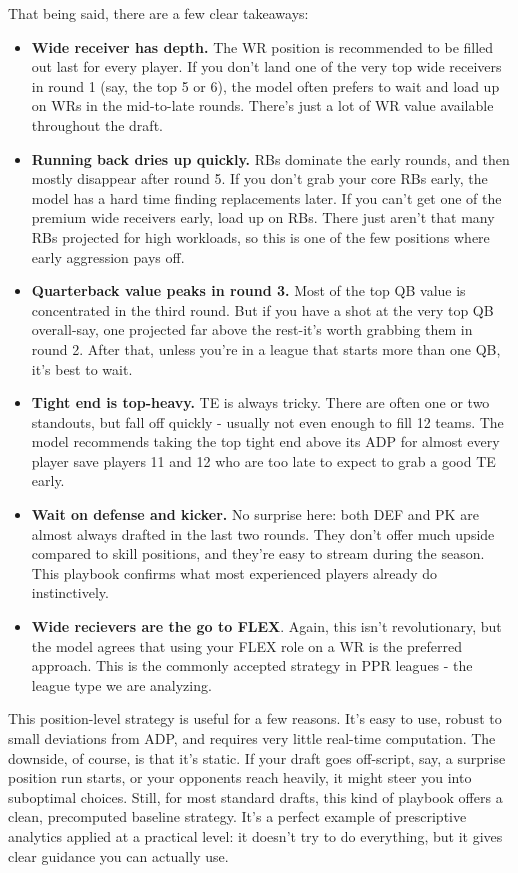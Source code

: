 \documentclass{article}
\begin{document}
That being said, there are a few clear takeaways:
\begin{itemize}
  \item \textbf{Wide receiver has depth.} The WR position is recommended to be filled out last for every player. If you don't land one of the very top wide receivers in round 1 (say, the top 5 or 6), the model often prefers to wait and load up on WRs in the mid-to-late rounds. There's just a lot of WR value available throughout the draft.
  \item \textbf{Running back dries up quickly.} RBs dominate the early rounds, and then mostly disappear after round 5. If you don't grab your core RBs early, the model has a hard time finding replacements later. If you can't get one of the premium wide receivers early, load up on RBs. There just aren't that many RBs projected for high workloads, so this is one of the few positions where early aggression pays off.
  \item \textbf{Quarterback value peaks in round 3.} Most of the top QB value is concentrated in the third round. But if you have a shot at the very top QB overall-say, one projected far above the rest-it's worth grabbing them in round 2. After that, unless you're in a league that starts more than one QB, it's best to wait.
  \item \textbf{Tight end is top-heavy.} TE is always tricky.  There are often one or two standouts, but fall off quickly - usually not even enough to fill 12 teams.  The model recommends taking the top tight end above its ADP for almost every player save players 11 and 12 who are too late to expect to grab a good TE early.
  \item \textbf{Wait on defense and kicker.} No surprise here: both DEF and PK are almost always drafted in the last two rounds. They don't offer much upside compared to skill positions, and they're easy to stream during the season. This playbook confirms what most experienced players already do instinctively.
  \item \textbf{Wide recievers are the go to FLEX}.  Again, this isn't revolutionary, but the model agrees that using your FLEX role on a WR is the preferred approach.  This is the commonly accepted strategy in PPR leagues - the league type we are analyzing.
\end{itemize}

This position-level strategy is useful for a few reasons.
It's easy to use, robust to small deviations from ADP, and requires very little real-time computation.
The downside, of course, is that it's static. If your draft goes off-script, say, a surprise position run starts, or your opponents reach heavily, it might steer you into suboptimal choices.
Still, for most standard drafts, this kind of playbook offers a clean, precomputed baseline strategy.
It's a perfect example of prescriptive analytics applied at a practical level: it doesn't try to do everything, but it gives clear guidance you can actually use.
\end{document}
